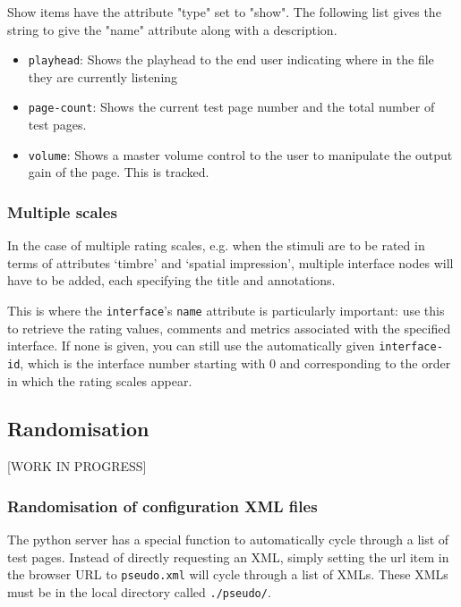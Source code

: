 \documentclass[11pt, oneside]{article}   	%
\begin{document}
        Show items have the attribute "type" set to "show". The following list gives the string to give the "name" attribute along with a description.
        \begin{itemize}
            \item \texttt{playhead}: Shows the playhead to the end user indicating where in the file they are currently listening
            \item \texttt{page-count}: Shows the current test page number and the total number of test pages.
            \item \texttt{volume}: Shows a master volume control to the user to manipulate the output gain of the page. This is tracked.
        \end{itemize}

		\subsubsection{Multiple scales}
			In the case of multiple rating scales, e.g. when the stimuli are to be rated in terms of attributes `timbre' and `spatial impression', multiple interface nodes will have to be added, each specifying the title and annotations. 

			This is where the \texttt{interface}'s \texttt{name} attribute is particularly important: use this to retrieve the rating values, comments and metrics associated with the specified interface. 
			If none is given, you can still use the automatically given \texttt{interface-id}, which is the interface number starting with 0 and corresponding to the order in which the rating scales appear. 

	\subsection{Randomisation}
	\label{sec:randomisation}
		[WORK IN PROGRESS]

		\subsubsection{Randomisation of configuration XML files}
		    The python server has a special function to automatically cycle through a list of test pages. Instead of directly requesting an XML, simply setting the url item in the browser URL to \texttt{pseudo.xml} will cycle through a list of XMLs. These XMLs must be in the local directory called \texttt{./pseudo/}.
\end{document}
